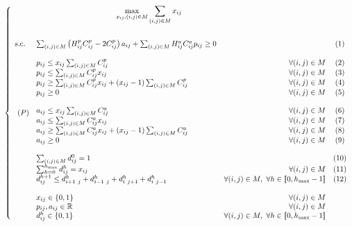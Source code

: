 \documentclass[a4paper,11pt]{article}
\begin{document}
\begin{equation}\tag{$P$}\hspace*{-0.1\linewidth}
\left\{ \begin{aligned}
& \hspace{0.4\linewidth} \max_{x_{ij}, (i,j) \in M} \sum_{(i,j) \in M} x_{ij} \\
& ~ \\
& \begin{array}{clrc}
\text{s.c. } & \sum_{(i,j)\in M} \left( H^p_{ij} C^p_{ij} - 2 C^p_{ij} \right) a_{ij} + \sum_{(i,j)\in M}  H^a_{ij} C^a_{ij} p_{ij} \ge 0 & ~ & (1) \\
~ & ~ & ~ & ~ \\
~ & p_{ij} \le x_{ij} \sum_{(i,j)\in M} C^p_{ij} & \forall (i,j) \in M & (2) \\
~ & p_{ij} \le \sum_{(i,j)\in M} C^p_{ij} x_{ij} & \forall (i,j) \in M &  (3) \\
~ & p_{ij} \ge \sum_{(i,j)\in M} C^p_{ij} x_{ij} + (x_{ij}-1) \sum_{(i,j)\in M} C^p_{ij} & \forall (i,j) \in M & (4)\\
~ & p_{ij} \ge 0 & \forall (i,j) \in M & (5) \\
~ & ~ & ~ \\
~ & a_{ij} \le x_{ij} \sum_{(i,j)\in M} C^a_{ij} & \forall (i,j) \in M & (6) \\
~ & a_{ij} \le \sum_{(i,j)\in M} C^a_{ij} x_{ij} & \forall (i,j) \in M & (7) \\
~ & a_{ij} \ge \sum_{(i,j)\in M} C^a_{ij} x_{ij} + (x_{ij}-1) \sum_{(i,j)\in M} C^a_{ij} & \forall (i,j) \in M & (8)\\
~ & a_{ij} \ge 0 & \forall (i,j) \in M & (9)\\
~ & ~ & ~ & ~ \\
~ & \sum_{(i,j)\in M} d^0_{ij} = 1 & ~ & (10)\\
~ & \sum_{h=0}^{h_{\max}} d^h_{ij} = x_{ij} & \forall (i,j) \in M & (11)\\
~ & d^{h+1}_{ij} \le d^h_{i+1~j} + d^h_{i-1~j} + d^h_{i~j+1} + d^h_{i~j-1} & \forall (i,j) \in M, ~ \forall h \in [\![ 0, h_{\max}-1 ]\!] & (12)\\
~ & ~ & ~ \\
~ & x_{ij} \in \left\{ 0,1 \right\} & \forall (i,j) \in M \\
~ & p_{ij}, a_{ij} \in \mathbb{R} & \forall (i,j) \in M \\
~ & d^h_{ij} \in \left\{ 0,1 \right\} & \forall (i,j) \in M, ~ \forall h \in [\![ 0, h_{\max}-1 ]\!] \\
\end{array} 
\end{aligned} \right.
\end{equation}
\end{document}
